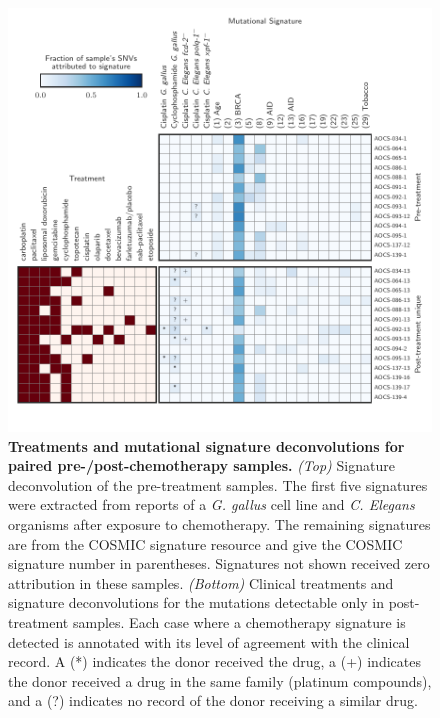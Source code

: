 \begin{figure}[htbp]
\centering
\includegraphics[scale=1.0]{figures/signatures.pdf}
\caption{\textbf{Treatments and mutational signature deconvolutions for paired pre-/post-chemotherapy samples.} \textit{(Top)} Signature deconvolution of the pre-treatment samples. The first five signatures were extracted from reports of a \textit{G. gallus}\cite{Szikriszt_2016} cell line and \textit{C. Elegans}\cite{Meier_2014} organisms after exposure to chemotherapy. The remaining signatures are from the COSMIC signature resource\cite{364242} and give the COSMIC signature number in parentheses. Signatures not shown received zero attribution in these samples. \textit{(Bottom)} Clinical treatments and signature deconvolutions for the mutations detectable only in post-treatment samples. Each case where a chemotherapy signature is detected is annotated with its level of agreement with the clinical record. A (*) indicates the donor received the drug, a (+) indicates the donor received a drug in the same family (platinum compounds), and a (?) indicates no record of the donor receiving a similar drug.}
\label{fig:signatures}
\end{figure}


